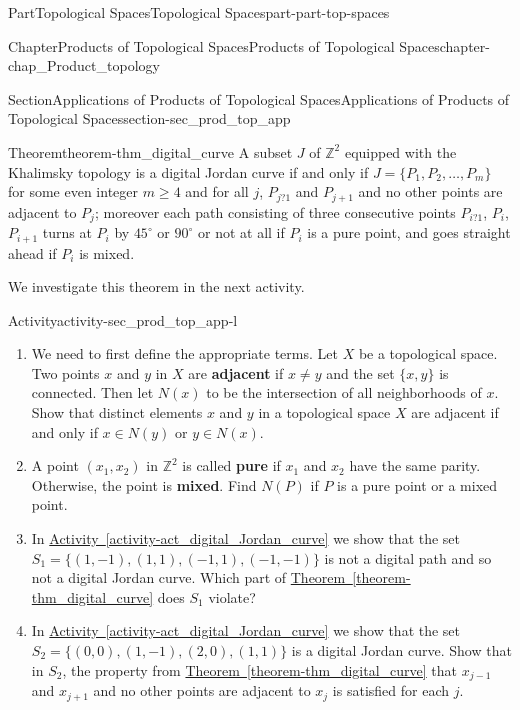 \documentclass[oneside,10pt,]{book}
\newcommand{\xreffont}{\relax}
\newcommand{\terminology}[1]{\textbf{#1}}
\numberwithin{equation}{chapter}
\providecommand\phantomsection{}
\newcommand{\Z}{\mathbb{Z}}
\begin{document}
\begin{partptx}{Part}{Topological Spaces}{}{Topological Spaces}{}{}{part-part-top-spaces}
\begin{chapterptx}{Chapter}{Products of Topological Spaces}{}{Products of Topological Spaces}{}{}{chapter-chap_Product_topology}
\begin{sectionptx}{Section}{Applications of Products of Topological Spaces}{}{Applications of Products of Topological Spaces}{}{}{section-sec_prod_top_app}
\begin{theorem}{Theorem}{}{}{theorem-thm_digital_curve}
A subset \(J\) of \(\Z^2\) equipped with the Khalimsky topology is a digital Jordan curve if and only if \(J = \{P_1, P_2, \ldots, P_m\}\) for some even integer \(m \geq 4\) and for all \(j\), \(P_{j?1}\) and \(P_{j+1}\) and no other points are adjacent to \(P_j\); moreover each path consisting of three consecutive points \(P_{i?1}\), \(P_i\), \(P_{i+1}\) turns at \(P_i\) by \(45^{\circ}\) or \(90^{\circ}\) or not at all if \(P_i\) is a pure point, and goes straight ahead if \(P_i\) is mixed.%
\end{theorem}
We investigate this theorem in the next activity.%
\begin{activity}{Activity}{}{activity-sec_prod_top_app-l}%
\begin{enumerate}[font=\bfseries,label=(\alph*),ref=\alph*]%
\item{}We need to first define the appropriate terms. Let \(X\) be a topological space. Two points \(x\) and \(y\) in \(X\) are \terminology{adjacent} if \(x \neq y\) and the set \(\{x, y\}\) is connected. Then let \(N(x)\) to be the intersection of all neighborhoods of \(x\). Show that distinct elements \(x\) and \(y\) in a topological space \(X\) are adjacent if and only if \(x \in N(y)\) or \(y \in N(x)\).%
\item{}A point \((x_1,x_2)\) in \(\Z^2\) is called \terminology{pure} if \(x_1\) and \(x_2\) have the same parity. Otherwise, the point is \terminology{mixed}. Find \(N(P)\) if \(P\) is a pure point or a mixed point.%
\item{}In \hyperref[activity-act_digital_Jordan_curve]{Activity~{\xreffont\ref{activity-act_digital_Jordan_curve}}} we show that the set \(S_1 = \{(1,-1), (1,1), (-1,1), (-1,-1)\}\) is not a digital path and so not a digital Jordan curve. Which part of \hyperref[theorem-thm_digital_curve]{Theorem~{\xreffont\ref{theorem-thm_digital_curve}}} does \(S_1\) violate?%
\item{}In \hyperref[activity-act_digital_Jordan_curve]{Activity~{\xreffont\ref{activity-act_digital_Jordan_curve}}} we show that the set \(S_2 = \{(0,0), (1,-1), (2,0), (1,1)\}\) is a digital Jordan curve. Show that in \(S_2\), the property from \hyperref[theorem-thm_digital_curve]{Theorem~{\xreffont\ref{theorem-thm_digital_curve}}} that \(x_{j-1}\) and \(x_{j+1}\) and no other points are adjacent to \(x_j\) is satisfied for each \(j\).%
\end{enumerate}%
\end{activity}%
\end{sectionptx}
\end{chapterptx}
\end{partptx}
%
\backmatter%
%
\clearpage\phantomsection%
%
%
{\xreffont\printindex}
%
\end{document}
